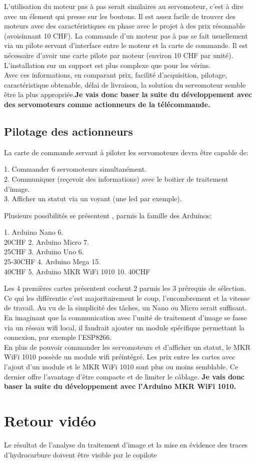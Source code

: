 L'utilisation du moteur pas à pas serait similaires au servomoteur, c'est à dire avec un élement qui presse sur les boutons.
Il est assez facile de trouver des moteurs avec des caractéristiques en phase avec le projet à des prix résonnable (avoisinnant 10 CHF). La commande d'un moteur pas à pas
se fait usuellement via un pilote servant d'interface entre le moteur et la carte de commande. Il est nécessaire d'avoir une carte pilote par moteur (environ 10 CHF par unité).
L'installation sur un support est plus complexe que pour les vérins.\\

Avec ces informations, en comparant prix, facilité d'acquisition, pilotage, caractéristique obtenable, délai de livraison, la solution du servomoteur semble être la plus
appropriée.\textbf{Je vais donc baser la suite du développement avec des servomoteurs comme actionneurs de la télécommande.}\\

\subsection{Pilotage des actionneurs}
La carte de commande servant à piloter les servomoteurs devra être capable de:
\begin{listage}
    1. Commander 6 servomoteurs simultanément.\\
    2. Communiquer (reçevoir des informations) avec le boitier de traitement d'image.\\
    3. Afficher un statut via un voyant (une led par exemple).
\end{listage}

Plusieurs possibilités se présentent , parmis la famille des Arduinos:
\begin{listage}
    1. Arduino Nano 6.\\ 20CHF
    2. Arduino Micro 7.\\ 25CHF
    3. Arduino Uno 6.\\ 25-30CHF
    4. Arduino Mega 15.\\ 40CHF
    5. Arduino MKR WiFi 1010 10. 40CHF
\end{listage}
Les 4 premières cartes présentent cochent 2 parmis les 3 prérequis de sélection. Ce qui les différentie c'est majoritairement le coup, l'encombrement et la vitesse de travail.
Au vu de la simplicité des tâches, un Nano ou Micro serait suffisant. En imaginant que la communication avec l'unité de traitement d'image se fasse via un réseau \Gls{wifi} local,
il faudrait ajouter un module spécifique permettant la connexion, par exemple l'ESP8266.\\
En plus de pouvoir commander les servomoteurs et d'afficher un statut, le MKR WiFi 1010 possède un module \Gls{wifi} préintégré.
Les prix entre les cartes avec l'ajout d'un module et le MKR WiFi 1010 sont plus ou moins semblable. Ce dernier offre l'avantage d'être compacte et de limiter le câblage.
\textbf{Je vais donc baser la suite du développement avec l'Arduino MKR WiFi 1010.}
\section{Retour vidéo}
Le résultat de l'analyse du traitement d'image et la mise en évidence des traces d'hydrocarbure doivent être visible par le copilote

